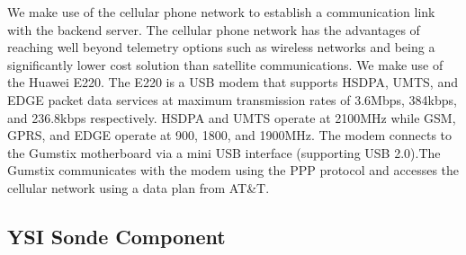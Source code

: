 \documentclass[conference]{IEEEtran}
\begin{document}


 

We make use of the cellular phone network to establish a communication
link with the backend server. The cellular phone network has the
advantages of reaching well beyond telemetry options such as wireless
networks and being a significantly lower cost solution than satellite
communications. We make use of the Huawei E220. The E220 is a USB
modem that supports HSDPA, UMTS, and EDGE packet data services at
maximum transmission rates of 3.6Mbps, 384kbps, and 236.8kbps
respectively.  HSDPA and UMTS operate at 2100MHz while GSM, GPRS, and
EDGE operate at 900, 1800, and 1900MHz. The modem connects to the
Gumstix motherboard via a mini USB interface (supporting USB 2.0).The
Gumstix communicates with the modem using the PPP protocol and
accesses the cellular network using a data plan from AT\&T.



\subsection{YSI Sonde Component}
\end{document}
